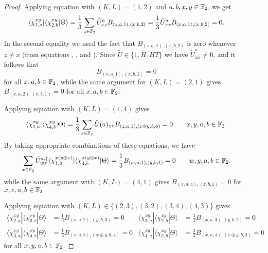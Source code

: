 \documentclass[../thesis-main/thesis-main]{subfiles}
\begin{document}
\begin{proof}
Applying equation  with $(K,L)=(1,2)$ and $a,b,x,y\in\mathbb{F}_2$, we get 
\begin{equation}
  \langle\chi_{1,a}^{xy}|\langle\chi_{2,b}^{xy}|\Theta\rangle=\frac{1}{3}\sum_{z\in \mathbb{F}_2}\tilde U^a_{xz}B_{\left(z,a,1\right),\left(x,b,2\right)}
    = \frac{1}{3} \tilde U^a_{xx}B_{\left(x,a,1\right),\left(x,b,2\right)} 
    =0.\label{eq:Uxx_eqn}
\end{equation}
In the second equality we used the fact that $B_{\left(z,a,1\right),\left(x,b,2\right)}$ is zero whenever $z\neq x$ (from equations , , and ). Since $\tilde{U}\in \{1,H,HT\}$ we have $\tilde{U}^a_{xx} \neq 0$, and it follows that
\begin{equation}
B_{\left(x,a,1\right),\left(x,b,2\right)}=0\label{eq:diag12}
\end{equation}
for all $x,a,b\in \mathbb{F}_2$, while the same argument for $(K,L) = (2,1)$ gives $B_{(x,a,2),(x,b,1)} = 0$ for all $x,a,b\in\mathbb{F}_2$.

Applying equation  with $(K,L)=(1,4)$ gives
\begin{equation}
\langle\chi_{1,a}^{xy}|\langle\chi_{4,b}^{xy}|\Theta\rangle=\frac{1}{3}\sum_{z\in \mathbb{F}_2} \tilde U (a)_{xz} B_{\left(z,a,1\right),\left(x\oplus y,b,4\right)}=0 \qquad x,y,a,b\in \mathbb{F}_2.
\end{equation}
By taking appropriate combinations of these equations, we have
\begin{equation}
\sum_{x\in \mathbb{F}_2} \tilde U^{a,\dagger}_{wx} \langle\chi_{1,a}^{x(y\oplus x)}|\langle\chi_{4,b}^{x (y\oplus x)}|\Theta\rangle= \frac{1}{3}B_{\left(w,a,1\right),\left(y,b,4\right)}=0 \qquad w,y,a,b\in \mathbb{F}_2, \label{eq:14constraint}
\end{equation}
while the same argument with $(K,L) = (4,1)$ gives $B_{(x,a,4),(z,b,1)} = 0$ for $x,z,a,b\in\mathbb{F}_2$

Applying equation  with $(K,L)\in \{(2,3),(3,2),(3,4), (4,3)\}$  gives
\begin{align}
\langle\chi_{2,a}^{xy}|\langle\chi_{3,b}^{xy}|\Theta\rangle& =\frac{1}{3}B_{\left(x,a,2\right),\left(y,b,3\right)}=0 &\langle\chi_{3,a}^{xy}|\langle\chi_{2,b}^{xy}|\Theta\rangle& =\frac{1}{3}B_{\left(x,a,3\right),\left(y,b,2\right)}=0 \label{eq:23constraint}\\
\langle\chi_{3,a}^{xy}|\langle\chi_{4,b}^{xy}|\Theta\rangle& =\frac{1}{3}B_{\left(x,a,3\right),\left(x\oplus y,b,4\right)}=0 &
\langle\chi_{4,a}^{xy}|\langle\chi_{3,b}^{xy}|\Theta\rangle& =\frac{1}{3}B_{\left(x,a,4\right),\left(x\oplus y,b,3\right)}=0\label{eq:43constraint}
\end{align}
for all $x,y,a,b\in \mathbb{F}_2$.


\end{proof}
\end{document}
